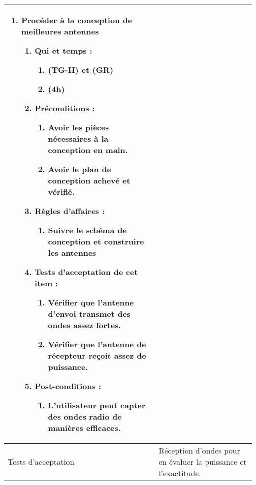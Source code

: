 \begin{longtable}{|l|p{}|}
\begin{enumerate}[label*=\arabic*.]
\begin{enumerate}[label*=\arabic*.]
\begin{enumerate}[label*=\arabic*.]
                    \end{enumerate}
                \end{enumerate}
            \item Procéder à la conception de meilleures antennes
                \begin{enumerate}[label*=\arabic*.]
                    \item Qui et temps :
                    \begin{enumerate}[label*=\arabic*.]
                        \item (TG-H) et (GR)
                        \item (4h)
                    \end{enumerate}
                    \item Préconditions : 
                    \begin{enumerate}[label*=\arabic*.]
                        \item Avoir les pièces nécessaires à la conception en main.
                        \item Avoir le plan de conception achevé et vérifié.
                    \end{enumerate}
                    \item Règles d’affaires :
                    \begin{enumerate}[label*=\arabic*.]
                        \item Suivre le schéma de conception et construire les antennes
                    \end{enumerate}
                    \item Tests d'acceptation de cet item :
                    \begin{enumerate}[label*=\arabic*.]
                        \item Vérifier que l'antenne d'envoi transmet des ondes assez fortes.
                        \item Vérifier que l'antenne de récepteur reçoit assez de puissance.
                    \end{enumerate}
                    \item Post-conditions :
                    \begin{enumerate}[label*=\arabic*.]
                        \item L'utilisateur peut capter des ondes radio de manières efficaces.
                    \end{enumerate}
                \end{enumerate}
        \end{enumerate} \\
\hline
    Tests d'acceptation & Réception d'ondes pour en évaluer la puissance et l'exactitude.\\


\end{longtable}

